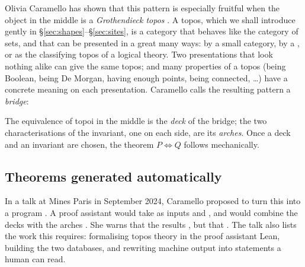 Olivia Caramello has shown that this pattern is especially fruitful when the object in the middle is a \emph{Grothendieck topos} \cite{caramello-unification,caramello-tst}. A topos, which we shall introduce gently in \S\ref{sec:shapes}--\S\ref{sec:sites}, is a category that behaves like the category of sets, and that can be presented in a great many ways: by a small category, by a , or as the classifying topos of a logical theory. Two presentations that look nothing alike can give the same topos; and many properties of a topos (being Boolean, being De Morgan, having enough points, being connected, \dots) have a concrete meaning on each presentation. Caramello calls the resulting pattern a \emph{bridge}:
\begin{center}
\end{center}
The equivalence of topoi in the middle is the \emph{deck} of the bridge; the two characterisations of the invariant, one on each side, are its \emph{arches}. Once a deck and an invariant are chosen, the theorem $P\iff Q$ follows mechanically.

\subsection{Theorems generated automatically}

In a talk at Mines Paris in September 2024, Caramello proposed to turn this into a program \cite{caramello-mines}. A proof assistant would take as inputs  and , and would combine the decks with the arches  \cite[slide 11]{caramello-mines}. She warns that the results , but that  \cite[slide 8]{caramello-mines}. The talk also lists the work this requires: formalising topos theory in the proof assistant Lean, building the two databases, and rewriting machine output into statements a human can read.

